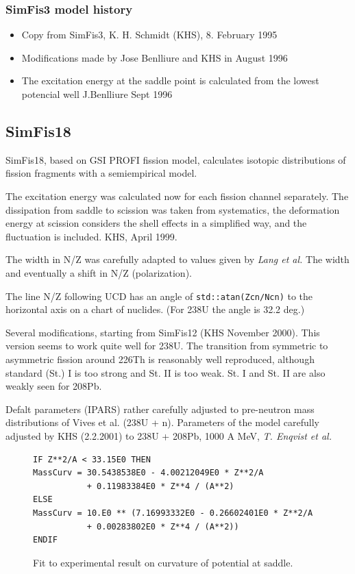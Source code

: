\subsubsection{SimFis3 model history}

\begin{itemize}
\item Copy from {\sf SimFis3}, K. H. Schmidt (KHS), 8. February 1995
\item Modifications made by Jose Benlliure and KHS in August 1996
\item The excitation energy at the saddle point is calculated from the
  lowest potencial well J.Benlliure Sept 1996
\end{itemize}

\subsection{SimFis18}
\label{simfig18}

{\sf SimFis18}, based on GSI PROFI fission model, calculates isotopic
distributions of fission fragments with a semiempirical model.

The excitation energy was calculated now for each fission channel
separately. The dissipation from saddle to scission was taken from
systematics, the deformation energy at scission considers the shell
effects in a simplified way, and the fluctuation is included. 
KHS, April 1999.

The width in N/Z was carefully adapted to values given by \emph{Lang
  et al.}  The width and eventually a shift in N/Z (polarization).

The line N/Z following UCD has an angle of {\tt std::atan(Zcn/Ncn)}
to the horizontal axis on a chart of nuclides.
(For 238U the angle is 32.2 deg.)

Several modifications, starting from {\sf SimFis12} (KHS November 2000).
This version seems to work quite well for 238U.                  
The transition from symmetric to asymmetric fission around 226Th 
is reasonably well reproduced, although standard (St.) I is too strong and St. II
is too weak. St. I and St. II are also weakly seen for 208Pb.

Defalt parameters (IPARS) rather carefully adjusted to
pre-neutron mass distributions of Vives et al. (238U + n).
Parameters of the model carefully adjusted by KHS (2.2.2001) to
238U + 208Pb, 1000 A MeV, \emph{T. Enqvist et al.}

\begin{figure}
\begin{verbatim}
IF Z**2/A < 33.15E0 THEN
MassCurv = 30.5438538E0 - 4.00212049E0 * Z**2/A
           + 0.11983384E0 * Z**4 / (A**2)
ELSE
MassCurv = 10.E0 ** (7.16993332E0 - 0.26602401E0 * Z**2/A
           + 0.00283802E0 * Z**4 / (A**2))
ENDIF
\end{verbatim}
\caption{Fit to experimental result on curvature of potential at saddle.}
\label{fig:masscurv2}
\end{figure}

